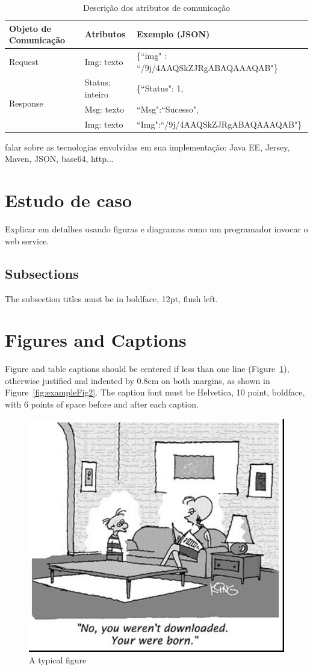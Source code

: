 \documentclass[12pt]{article}
\begin{document}
\begin{table}[ht]
	\centering
	\caption{Descrição dos atributos de comunicação}
	\label{tab:Table1}
	\smallskip
	\begin{tabular}{ |l|l|l| }
		\hline
		Objeto de Comunicação & Atributos & Exemplo (JSON) \\ \hline
		Request & Img: texto & \{“img" : “/9j/4AAQSkZJRgABAQAAAQAB"\} \\ \hline
		\multirow{3}{*}{Response} & Status: inteiro & \{“Status": 1, \\
		& Msg: texto & “Msg":“Sucesso", \\
		& Img: texto & “Img":“/9j/4AAQSkZJRgABAQAAAQAB"\} \\
		\hline
	\end{tabular}
\end{table}

falar sobre as tecnologias envolvidas em sua implementação: Java EE, Jersey, Maven, JSON, base64, http...

\section{Estudo de caso}

Explicar em detalhes usando figuras e diagramas como um programador invocar o web service.

\subsection{Subsections}

The subsection titles must be in boldface, 12pt, flush left.

\section{Figures and Captions}\label{sec:figs}


Figure and table captions should be centered if less than one line
(Figure~\ref{fig:exampleFig1}), otherwise justified and indented by 0.8cm on
both margins, as shown in Figure~\ref{fig:exampleFig2}. The caption font must
be Helvetica, 10 point, boldface, with 6 points of space before and after each
caption.

\begin{figure}[ht]
\centering
\includegraphics[width=.5\textwidth]{fig1.jpg}
\caption{A typical figure}
\label{fig:exampleFig1}
\end{figure}
\end{document}
